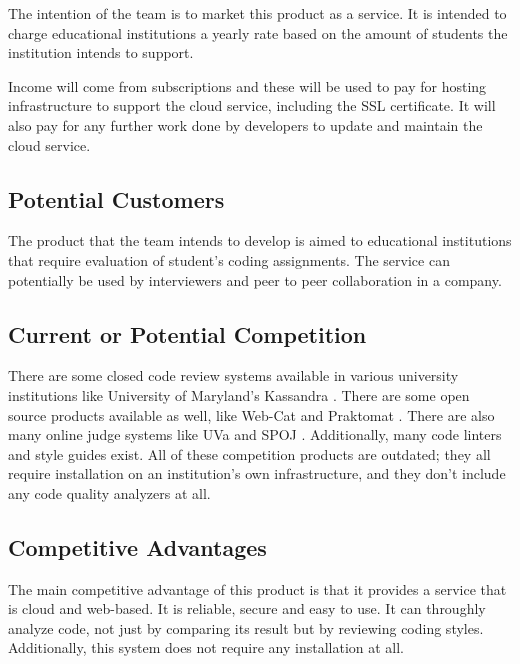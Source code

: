 
The intention of the team is to market this product as a service. It is intended
to charge educational institutions a yearly rate based on the amount of students
the institution intends to support.

Income will come from subscriptions and these will be used to pay for hosting
infrastructure to support the cloud service, including the SSL certificate. It
will also pay for any further work done by developers to update and maintain the
cloud service.

\subsection{Potential Customers}

The product that the team intends to develop is aimed to educational
institutions that require evaluation of student's coding assignments. The
service can potentially be used by interviewers and peer to peer collaboration
in a company.

\subsection{Current or Potential Competition}

There are some closed code review systems available in various university
institutions like University of Maryland's Kassandra \cite{Matt1994}. There are
some open source products available as well, like Web-Cat \cite{WebCat} and
Praktomat \cite{Praktomat}. There are also many online judge systems like UVa
\cite{UVA} and SPOJ \cite{SPOJ}. Additionally, many code linters and style
guides exist. All of these competition products are outdated; they all require
installation on an institution's own infrastructure, and they don't include any
code quality analyzers at all.

\subsection{Competitive Advantages}

The main competitive advantage of this product is that it provides a service
that is cloud and web-based. It is reliable, secure and easy to use. It can
throughly analyze code, not just by comparing its result but by reviewing coding
styles. Additionally, this system does not require any installation at all.
